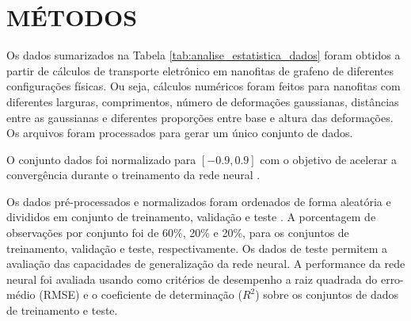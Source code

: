 \documentclass[a4paper,12pt]{article}
\begin{document}
	

	\section{MÉTODOS} \label{sec:method}
	
	Os dados sumarizados na Tabela \ref{tab:analise_estatistica_dados} foram obtidos a partir de cálculos de transporte eletrônico em nanofitas de grafeno de diferentes configurações físicas. Ou seja, cálculos numéricos foram feitos para nanofitas com diferentes larguras, comprimentos, número de deformações gaussianas, distâncias entre as gaussianas e diferentes proporções entre base e altura das deformações. Os arquivos foram processados para gerar um único conjunto de dados.
	
	O conjunto dados foi normalizado para $[-0.9, 0.9]$ com o objetivo de acelerar a convergência durante o treinamento da rede neural \cite{lecun1993efficient}.
	
	Os dados pré-processados e normalizados foram ordenados de forma aleatória e divididos em conjunto de treinamento, validação e teste \cite{kearns1996bound}. A porcentagem de observações por conjunto foi de 60\%, 20\% e 20\%, para os conjuntos de treinamento, validação e teste, respectivamente. Os dados de teste permitem a avaliação das capacidades de generalização da rede neural. A performance da rede neural foi avaliada usando como critérios de desempenho a raiz quadrada do erro-médio (RMSE) e o coeficiente de determinação ($R^2$) sobre os conjuntos de dados de treinamento e teste.
\end{document}
